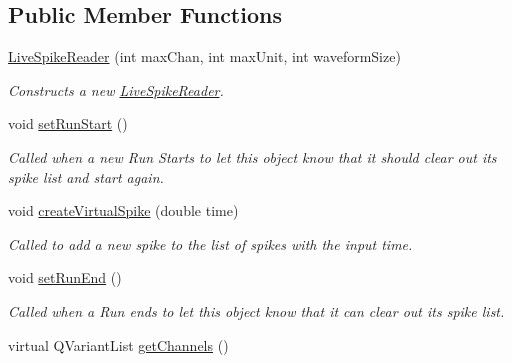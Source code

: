 \subsection*{Public Member Functions}
\begin{DoxyCompactItemize}
\item 
\hyperlink{class_picto_1_1_live_spike_reader_abd39bfe29088aa9432f98ed39989cd77}{Live\-Spike\-Reader} (int max\-Chan, int max\-Unit, int waveform\-Size)
\begin{DoxyCompactList}\small\item\em Constructs a new \hyperlink{class_picto_1_1_live_spike_reader}{Live\-Spike\-Reader}. \end{DoxyCompactList}\item 
\hypertarget{class_picto_1_1_live_spike_reader_a580726c1849d100f000bf365801915a6}{void \hyperlink{class_picto_1_1_live_spike_reader_a580726c1849d100f000bf365801915a6}{set\-Run\-Start} ()}\label{class_picto_1_1_live_spike_reader_a580726c1849d100f000bf365801915a6}

\begin{DoxyCompactList}\small\item\em Called when a new Run Starts to let this object know that it should clear out its spike list and start again. \end{DoxyCompactList}\item 
void \hyperlink{class_picto_1_1_live_spike_reader_a986c153f3ef2004bbfed368bdeba2290}{create\-Virtual\-Spike} (double time)
\begin{DoxyCompactList}\small\item\em Called to add a new spike to the list of spikes with the input time. \end{DoxyCompactList}\item 
\hypertarget{class_picto_1_1_live_spike_reader_a6deedbc6fce55e5dd9b5fd91e4098512}{void \hyperlink{class_picto_1_1_live_spike_reader_a6deedbc6fce55e5dd9b5fd91e4098512}{set\-Run\-End} ()}\label{class_picto_1_1_live_spike_reader_a6deedbc6fce55e5dd9b5fd91e4098512}

\begin{DoxyCompactList}\small\item\em Called when a Run ends to let this object know that it can clear out its spike list. \end{DoxyCompactList}\item 
\hypertarget{class_picto_1_1_live_spike_reader_afed5705f249864f0479558b5130a11d2}{virtual Q\-Variant\-List \hyperlink{class_picto_1_1_live_spike_reader_afed5705f249864f0479558b5130a11d2}{get\-Channels} ()}\label{class_picto_1_1_live_spike_reader_afed5705f249864f0479558b5130a11d2}


\end{DoxyCompactItemize}
